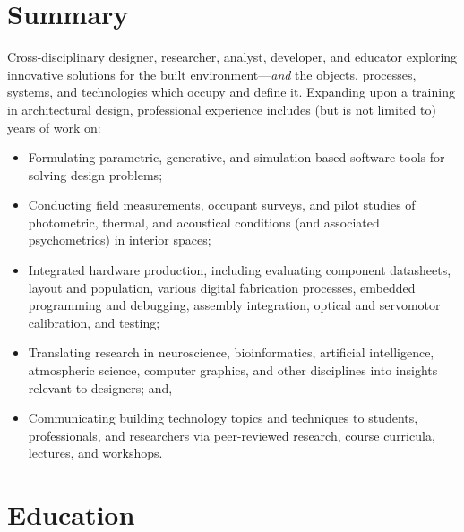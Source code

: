 \documentclass[letterpaper, oneside, 10pt]{article}
\begin{document}
\StartCV%

\section*{Summary} %

Cross-disciplinary designer, researcher, analyst, developer, and educator
exploring innovative solutions for the built environment---\textit{and} the
objects, processes, systems, and technologies which occupy and define it.
Expanding upon a training in architectural design, professional experience
includes (but is not limited to)  years of work on:

\vspace{-1em}

\begin{itemize}[label={--}, itemsep=0em, leftmargin=1em]

  \item Formulating parametric, generative, and simulation-based software tools
  for solving design problems;

  \item Conducting field measurements, occupant surveys, and pilot studies of
  photometric, thermal, and acoustical conditions (and associated
  psychometrics) in interior spaces;

  \item Integrated hardware production, including evaluating component
  datasheets,  layout and population, various digital fabrication
  processes, embedded programming and debugging, assembly integration, optical
  and servomotor calibration, and testing;

  \item Translating research in neuroscience, bioinformatics, artificial
  intelligence, atmospheric science, computer graphics, and other disciplines
  into insights relevant to designers; and,

  \item Communicating building technology topics and techniques to students,
  professionals, and researchers via peer-reviewed research, course curricula,
  lectures, and workshops.

\end{itemize}



\section*{Education} %
\AdjSectSpace
\end{document}
